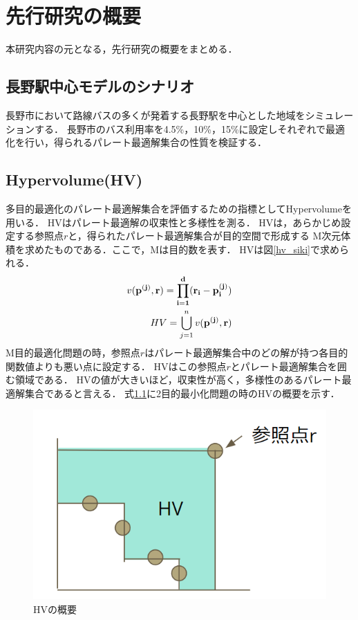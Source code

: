 \documentclass[main]{subfiles}
\begin{document}
\chapter{先行研究の概要}
    本研究内容の元となる，先行研究の概要をまとめる\cite{senkoukenkyu}．

    \section{長野駅中心モデルのシナリオ}
    長野市において路線バスの多くが発着する長野駅を中心とした地域をシミュレーションする．
    長野市のバス利用率を4.5\%，10\%，15\%に設定しそれぞれで最適化を行い，得られるパレート最適解集合の性質を検証する．

    \section{Hypervolume(HV)}
    多目的最適化のパレート最適解集合を評価するための指標としてHypervolumeを用いる\cite{hv}．
    HVはパレート最適解の収束性と多様性を測る．
    HVは，あらかじめ設定する参照点\boldmath$r$と，得られたパレート最適解集合が目的空間で形成する
    M次元体積を求めたものである．ここで，Mは目的数を表す．
    HVは図\ref{hv_siki}で求められる．
    \begin{align}
        v(\bf{p}^{(j)}, \bf r) = \prod_{i=1}^d (r_i - p_i^{(j)}) \\
        HV = \bigcup_{j=1}^n v(\bf{p}^{(j)}, \bf r)
        \label{hv_siki}
    \end{align}
    M目的最適化問題の時，参照点\boldmath$r$はパレート最適解集合中のどの解が持つ各目的関数値よりも悪い点に設定する．
    HVはこの参照点\boldmath$r$とパレート最適解集合を囲む領域である．
    HVの値が大きいほど，収束性が高く，多様性のあるパレート最適解集合であると言える．
    式\ref{hv_image}に2目的最小化問題の時のHVの概要を示す．

    \begin{figure}
        \centering
        \includegraphics[width=\linewidth]{figures/hv_image.png}
        \caption{HVの概要}
        \label{hv_image}
    \end{figure}
\end{document}
